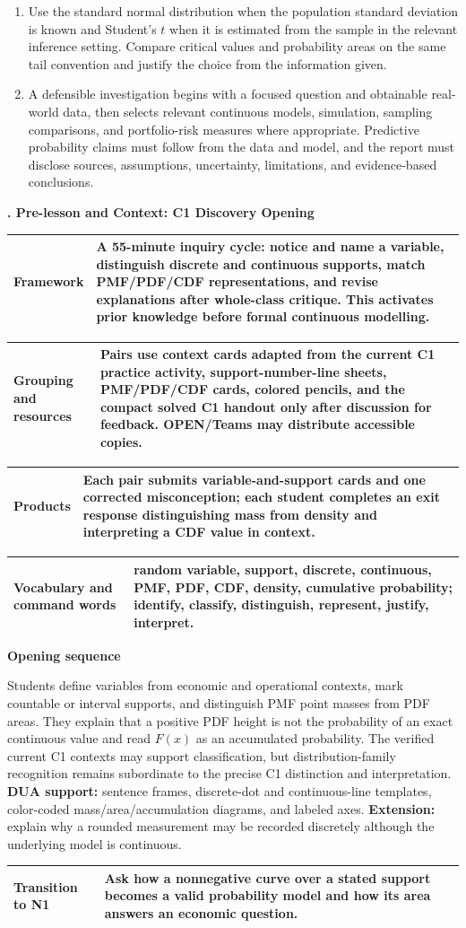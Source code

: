\documentclass[10pt,letterpaper]{article}
\newcommand{\sectionbar}[1]{%
	\begin{tcolorbox}[
		enhanced,
		colback=sectionblue,
		colframe=sectionblue,
		boxrule=0pt,
		sharp corners,
		left=0.32in,
		right=0.08in,
		top=3.5pt,
		bottom=3.5pt,
		before skip=0pt,
		after skip=0pt,
		borderline north={1.15pt}{0pt}{black},
		borderline south={1.15pt}{0pt}{black}
		]
		\color{white}\bfseries\fontsize{12}{14}\selectfont #1
	\end{tcolorbox}%
}
\newcommand{\plansection}[1]{%
	\Needspace{8\baselineskip}\par\vspace{0.23in}\sectionbar{#1}\vspace{0.20in}%
}
\newcommand{\criterionpart}[1]{%
	\Needspace{10\baselineskip}\par\vspace{5pt}%
	\begin{tcolorbox}[
		colback=sectionblue!7,
		colframe=borderblue,
		boxrule=0.8pt,
		sharp corners,
		left=6pt,right=6pt,top=3pt,bottom=3pt,
		before skip=0pt,after skip=2pt]
		\bfseries #1
	\end{tcolorbox}%
}
\newcommand{\labelled}[2]{%
	\noindent
	\begin{tabularx}{\textwidth}{|>{\RaggedRight\arraybackslash\bfseries}p{2.12in}|>{\RaggedRight\arraybackslash}X|}
		\hline
		#1 & #2\\
		\hline
	\end{tabularx}\par\vspace{-\arrayrulewidth}%
}
\begin{document}
\begin{bluebox}
\begin{enumerate}[label=\textbf{\arabic*.}]
  \item Use the standard normal distribution when the population standard deviation is known and Student's $t$ when it is estimated from the sample in the relevant inference setting. Compare critical values and probability areas on the same tail convention and justify the choice from the information given.
  \item A defensible investigation begins with a focused question and obtainable real-world data, then selects relevant continuous models, simulation, sampling comparisons, and portfolio-risk measures where appropriate. Predictive probability claims must follow from the data and model, and the report must disclose sources, assumptions, uncertainty, limitations, and evidence-based conclusions.
\end{enumerate}
\end{bluebox}

\plansection{4. Pre-lesson and Context: C1 Discovery Opening}
\labelled{Framework}{A 55-minute inquiry cycle: notice and name a variable, distinguish discrete and continuous supports, match PMF/PDF/CDF representations, and revise explanations after whole-class critique. This activates prior knowledge before formal continuous modelling.}
\labelled{Grouping and resources}{Pairs use context cards adapted from the current C1 practice activity, support-number-line sheets, PMF/PDF/CDF cards, colored pencils, and the compact solved C1 handout only after discussion for feedback. OPEN/Teams may distribute accessible copies.}
\labelled{Products}{Each pair submits variable-and-support cards and one corrected misconception; each student completes an exit response distinguishing mass from density and interpreting a CDF value in context.}
\labelled{Vocabulary and command words}{random variable, support, discrete, continuous, PMF, PDF, CDF, density, cumulative probability; identify, classify, distinguish, represent, justify, interpret.}

\criterionpart{Opening sequence}
\begin{bluebox}
Students define variables from economic and operational contexts, mark countable or interval supports, and distinguish PMF point masses from PDF areas. They explain that a positive PDF height is not the probability of an exact continuous value and read $F(x)$ as an accumulated probability. The verified current C1 contexts may support classification, but distribution-family recognition remains subordinate to the precise C1 distinction and interpretation. \textbf{DUA support:} sentence frames, discrete-dot and continuous-line templates, color-coded mass/area/accumulation diagrams, and labeled axes. \textbf{Extension:} explain why a rounded measurement may be recorded discretely although the underlying model is continuous.
\end{bluebox}
\labelled{Transition to N1}{Ask how a nonnegative curve over a stated support becomes a valid probability model and how its area answers an economic question.}
\end{document}
